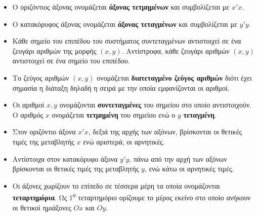 \documentclass[twoside,11pt,a4paper,openany]{book}
\begin{document}
\begin{itemize}[itemsep=0mm]
\item Ο οριζόντιος άξονας ονομάζεται \textbf{άξονας τετμημένων} και συμβολίζεται με $ x'x $.
\item Ο κατακόρυφος άξονας ονομάζεται \textbf{άξονας τεταγμένων} και συμβολίζεται με $ y'y $.
\item Κάθε σημείο του επιπέδου του συστήματος συντεταγμένων αντιστοιχεί σε ένα ζευγάρι αριθμών της μορφής $(x,y)$. Αντίστροφα, κάθε ζευγάρι αριθμών $(x,y)$ αντιστοιχεί σε ένα σημείο του επιπέδου.
\item Το ζεύγος αριθμών $(x,y)$ ονομάζεται \textbf{διατεταγμένο ζεύγος αριθμών} διότι έχει σημασία η διάταξη δηλαδή η σειρά με την οποία εμφανίζονται οι αριθμοί.
\item Οι αριθμοί $x,y$ ονομάζονται \textbf{συντεταγμένες} του σημείου στο οποίο αντιστοιχούν. Ο αριθμός $x$ ονομάζεται \textbf{τετμημένη} του σημείου ενώ ο $y$ \textbf{τεταγμένη}.
\item Στον οριζόντιο άξονα $ x'x $, δεξιά της αρχής των αξόνων, βρίσκονται οι θετικές τιμές της μεταβλητής $x$ ενώ αριστερά, οι αρνητικές.
\item Αντίστοιχα στον κατακόρυφο άξονα $ y'y $, πάνω από την αρχή των αξόνων βρίσκονται οι θετικές τιμές της μεταβλητής $y$, ενώ κάτω οι αρνητικές τιμές.
\item Οι άξονες χωρίζουν το επίπεδο σε τέσσερα μέρη τα οποία ονομάζονται \textbf{τεταρτημόρια}. Ως 1\textsuperscript{ο} τεταρτημόριο ορίζουμε το μέρος εκείνο στο οποίο ανήκουν οι θετικοί ημιάξονες $ Ox $ και $ Oy $.
\end{itemize}
\end{document}
